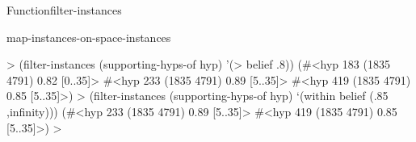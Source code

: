 \documentclass[10pt,twoside,english,pdftex]{article}
\begin{document}
\begin{functiondoc}{Function}{filter-instances}
\begin{alsos}{map-instances-on-space-instances}
\end{alsos}

\fnexamples
%
\W\supp
\begin{example}
  > (filter-instances (supporting-hyps-of hyp) '(> belief .8))
  (#<hyp 183 (1835 4791) 0.82 [0..35]>
   #<hyp 233 (1835 4791) 0.89 [5..35]>
   #<hyp 419 (1835 4791) 0.85 [5..35]>)\goodpagebreak
  > (filter-instances (supporting-hyps-of hyp) `(within belief (.85 ,infinity)))
  (#<hyp 233 (1835 4791) 0.89 [5..35]>
   #<hyp 419 (1835 4791) 0.85 [5..35]>)
  >
\end{example}

\fnnote
\patternnote

\end{functiondoc}

\end{document}
